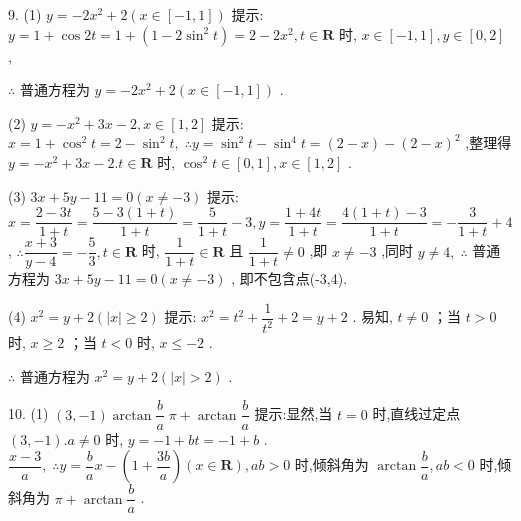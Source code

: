 9. (1) $y =  - 2{x}^{2} + 2\left( {x \in  \left\lbrack  {-1,1}\right\rbrack  }\right)$ 提示: $y = 1 + \cos {2t} = 1 + \left( {1 - 2{\sin }^{2}t}\right)  = 2 - 2{x}^{2},t \in  \mathbf{R}$ 时, $x \in  \left\lbrack  {-1,1}\right\rbrack  ,y \in  \left\lbrack  {0,2}\right\rbrack$ ,

$\therefore$ 普通方程为 $y =  - 2{x}^{2} + 2\left( {x \in  \left\lbrack  {-1,1}\right\rbrack  }\right)$ .

(2) $y =  - {x}^{2} + {3x} - 2,x \in  \left\lbrack  {1,2}\right\rbrack$ 提示: $x = 1 + {\cos }^{2}t = 2 - {\sin }^{2}t,\;\therefore y = {\sin }^{2}t - {\sin }^{4}t = \left( {2 - x}\right)  - {\left( 2 - x\right) }^{2}$ ,整理得 $y =  - {x}^{2} + {3x} - 2.t \in  \mathbf{R}$ 时, ${\cos }^{2}t \in  \left\lbrack  {0,1}\right\rbrack  ,x \in  \left\lbrack  {1,2}\right\rbrack$ .

(3) ${3x} + {5y} - {11} = 0\left( {x \neq   - 3}\right)$ 提示: $x = \dfrac{2 - {3t}}{1 + t} = \dfrac{5 - 3\left( {1 + t}\right) }{1 + t} = \dfrac{5}{1 + t} - 3,y = \dfrac{1 + {4t}}{1 + t} = \dfrac{4\left( {1 + t}\right)  - 3}{1 + t} =  - \dfrac{3}{1 + t} + 4$ , $\therefore \dfrac{x + 3}{y - 4} =  - \dfrac{5}{3},t \in  \mathbf{R}$ 时, $\dfrac{1}{1 + t} \in  \mathbf{R}$ 且 $\dfrac{1}{1 + t} \neq  0$ ,即 $x \neq   - 3$ ,同时 $y \neq  4,\;\therefore$ 普通方程为 ${3x} + {5y} - {11} = 0\left( {x \neq   - 3}\right)$ , 即不包含点(-3,4).

(4) ${x}^{2} = y + 2\left( {\left| x\right|  \geq  2}\right)$ 提示: ${x}^{2} = {t}^{2} + \dfrac{1}{{t}^{2}} + 2 = y + 2$ . 易知, $t \neq  0$ ；当 $t > 0$ 时, $x \geq  2$ ；当 $t < 0$ 时, $x \leq   - 2$ .

$\therefore$ 普通方程为 ${x}^{2} = y + 2\left( {\left| x\right|  > 2}\right)$ .

10. (1) $\left( {3, - 1}\right) \arctan \dfrac{b}{a}\;\pi  + \arctan \dfrac{b}{a}$ 提示:显然,当 $t = 0$ 时,直线过定点 $\left( {3, - 1}\right) .a \neq  0$ 时, $y =  - 1 + {bt} =  - 1 + b$ . $\dfrac{x - 3}{a},\;\therefore y = \dfrac{b}{a}x - \left( {1 + \dfrac{3b}{a}}\right) \left( {x \in  \mathbf{R}}\right) ,{ab} > 0$ 时,倾斜角为 $\arctan \dfrac{b}{a},{ab} < 0$ 时,倾斜角为 $\pi  + \arctan \dfrac{b}{a}$ .

